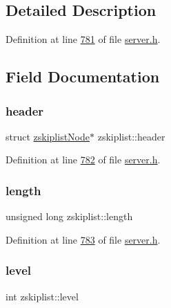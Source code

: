 \subsection{Detailed Description}


Definition at line \hyperlink{server_8h_source_l00781}{781} of file \hyperlink{server_8h_source}{server.\+h}.



\subsection{Field Documentation}
\mbox{\label{structzskiplist_ac8474a834420b5a7625ba9bf51030af2}} 
\subsubsection{\texorpdfstring{header}{header}}
{\footnotesize\ttfamily struct \hyperlink{structzskiplistNode}{zskiplist\+Node}$\ast$ zskiplist\+::header}



Definition at line \hyperlink{server_8h_source_l00782}{782} of file \hyperlink{server_8h_source}{server.\+h}.

\mbox{\label{structzskiplist_aa93a7ff84a3165a1956bc9d4c58fe51b}} 
\subsubsection{\texorpdfstring{length}{length}}
{\footnotesize\ttfamily unsigned long zskiplist\+::length}



Definition at line \hyperlink{server_8h_source_l00783}{783} of file \hyperlink{server_8h_source}{server.\+h}.

\mbox{\label{structzskiplist_a98e54430e6d11f83dbcd48d41dfa0a5a}} 
\subsubsection{\texorpdfstring{level}{level}}
{\footnotesize\ttfamily int zskiplist\+::level}



